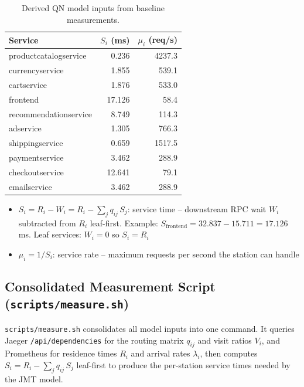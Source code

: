 \documentclass[12pt]{article}
\begin{document}
\begin{table}[H]
  \centering
  \small
  \setlength{\tabcolsep}{5pt}
  \begin{tabular}{l|r|r}
    \toprule
    Service & $S_i$ (ms) & $\mu_i$ (req/s) \\
    \midrule
    productcatalogservice &  0.236 & 4237.3 \\
    currencyservice       &  1.855 &  539.1 \\
    cartservice           &  1.876 &  533.0 \\
    frontend              & 17.126 &   58.4 \\
    recommendationservice &  8.749 &  114.3 \\
    adservice             &  1.305 &  766.3 \\
    shippingservice       &  0.659 & 1517.5 \\
    paymentservice        &  3.462 &  288.9 \\
    checkoutservice       & 12.641 &   79.1 \\
    emailservice          &  3.462 &  288.9 \\
    \bottomrule
  \end{tabular}
  \caption[Derived QN model inputs]{Derived QN model inputs from baseline measurements.}
  \label{tab:model-inputs}
  \vspace{0.5ex}
  \begin{minipage}{\linewidth}
    \footnotesize
    \begin{itemize}
      \item $S_i = R_i - W_i = R_i - \sum_j q_{ij}\,S_j$: service time -- downstream RPC wait $W_i$ subtracted from $R_i$ leaf-first. Example: $S_{\text{frontend}} = 32.837 - 15.711 = 17.126$\,ms. Leaf services: $W_i = 0$ so $S_i = R_i$
      \item $\mu_i = 1/S_i$: service rate -- maximum requests per second the station can handle
    \end{itemize}
  \end{minipage}
\end{table}

\subsection{Consolidated Measurement Script (\texttt{scripts/measure.sh})}

\texttt{scripts/measure.sh} consolidates all model inputs into one command. It queries Jaeger \texttt{/api/dependencies} for the routing matrix $q_{ij}$ and visit ratios $V_i$, and Prometheus for residence times $R_i$ and arrival rates $\lambda_i$, then computes $S_i = R_i - \sum_j q_{ij}\,S_j$ leaf-first to produce the per-station service times needed by the JMT model.
\end{document}
